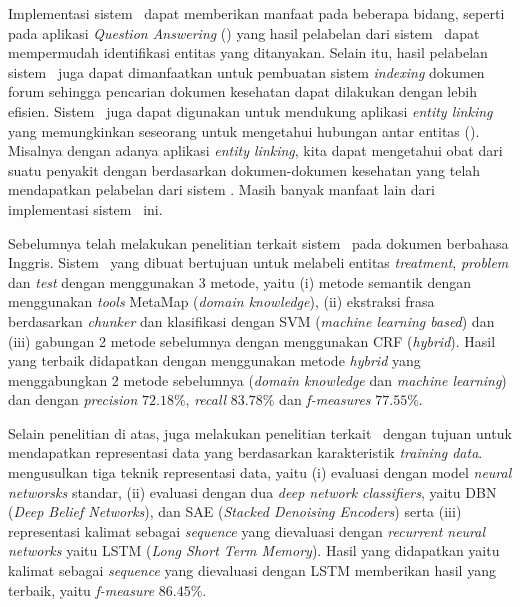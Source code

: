 Implementasi sistem \mer~dapat memberikan manfaat pada beberapa bidang, seperti pada aplikasi \textit{Question Answering} (\cite{abacha2011medical}) yang hasil pelabelan dari sistem \mer~dapat mempermudah identifikasi entitas yang ditanyakan. Selain itu, hasil pelabelan sistem \mer~juga dapat dimanfaatkan untuk pembuatan sistem \textit{indexing} dokumen forum sehingga pencarian dokumen kesehatan dapat dilakukan dengan lebih efisien. Sistem \mer~juga dapat digunakan untuk mendukung aplikasi \textit{entity linking} yang memungkinkan seseorang untuk mengetahui hubungan antar entitas (\cite{hachey2013evaluating}). Misalnya dengan adanya aplikasi \textit{entity linking}, kita dapat mengetahui obat dari suatu penyakit dengan berdasarkan dokumen-dokumen kesehatan yang telah mendapatkan pelabelan dari sistem \mer. Masih banyak manfaat lain dari implementasi sistem \mer~ini.

Sebelumnya \cite{abacha2011medical} telah melakukan penelitian terkait sistem \mer~pada dokumen berbahasa Inggris. Sistem \mer~yang dibuat bertujuan untuk melabeli entitas \textit{treatment}, \textit{problem} dan \textit{test} dengan menggunakan 3 metode, yaitu (i) metode semantik dengan menggunakan \textit{tools} MetaMap (\textit{domain knowledge}), (ii) ekstraksi frasa berdasarkan \textit{chunker} dan klasifikasi dengan SVM (\textit{machine learning based}) dan (iii) gabungan 2 metode sebelumnya dengan menggunakan CRF (\textit{hybrid}). Hasil yang terbaik didapatkan dengan menggunakan metode \textit{hybrid} yang menggabungkan 2 metode sebelumnya (\textit{domain knowledge} dan \textit{machine learning}) dan dengan \textit{precision} $ 72.18\% $, \textit{recall} $ 83.78\% $ dan \textit{f-measures} $ 77.55\% $.

Selain penelitian di atas, \cite{mujiono2016new} juga melakukan penelitian terkait \mer~dengan tujuan untuk mendapatkan representasi data yang berdasarkan karakteristik \textit{training data}. \cite{mujiono2016new} mengusulkan tiga teknik representasi data, yaitu (i) evaluasi dengan model \textit{neural networsks} standar, (ii) evaluasi dengan dua \textit{deep network classifiers}, yaitu DBN (\textit{Deep Belief Networks}), dan SAE (\textit{Stacked Denoising Encoders}) serta (iii) representasi kalimat sebagai \textit{sequence} yang dievaluasi dengan \textit{recurrent neural networks} yaitu LSTM (\textit{Long Short Term Memory}). Hasil yang didapatkan yaitu kalimat sebagai \textit{sequence} yang dievaluasi dengan LSTM memberikan hasil yang terbaik, yaitu \textit{f-measure} $ 86.45\% $.

